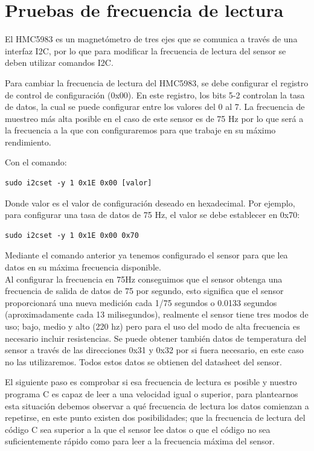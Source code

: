 \section{Pruebas de frecuencia de lectura}

El HMC5983 es un magnetómetro de tres ejes que se comunica a través de una interfaz I2C, por lo que para modificar la frecuencia de lectura del sensor se deben utilizar comandos I2C.

Para cambiar la frecuencia de lectura del HMC5983, se debe configurar el registro de control de configuración (0x00). En este registro, los bits 5-2 controlan la tasa de datos, la cual se puede configurar entre los valores del 0 al 7. La frecuencia de muestreo más alta posible en el caso de este sensor es de 75 Hz por lo que será a la frecuencia a la que con configuraremos para que trabaje en su máximo rendimiento.

Con el comando: 
\begin{lstlisting}[style=terminal]
sudo i2cset -y 1 0x1E 0x00 [valor] 
\end{lstlisting}

Donde valor es el valor de configuración deseado en hexadecimal. Por ejemplo, para configurar una tasa de datos de 75 Hz, el valor se debe establecer en 0x70:

\begin{lstlisting}[style=terminal]
sudo i2cset -y 1 0x1E 0x00 0x70  
\end{lstlisting}


Mediante el comando anterior ya tenemos configurado el sensor para que lea datos en su máxima frecuencia disponible.\\

Al configurar la frecuencia en 75Hz conseguimos que el sensor obtenga una frecuencia de salida de datos de 75 por segundo, esto significa que el sensor proporcionará una nueva medición cada 1/75 segundos o 0.0133 segundos (aproximadamente cada 13 milisegundos), realmente el sensor tiene tres modos de uso; bajo, medio y alto (220 hz) pero para el uso del modo de alta frecuencia es necesario incluir resistencias. Se puede obtener también datos de temperatura del sensor a través de las direcciones 0x31 y 0x32 por si fuera necesario, en este caso no las utilizaremos. Todos estos datos se obtienen del datasheet del sensor.

El siguiente paso es comprobar si esa frecuencia de lectura es posible y nuestro programa C es capaz de leer a una velocidad igual o superior, para plantearnos esta situación debemos observar a qué frecuencia de lectura los datos comienzan a repetirse, en este punto existen dos posibilidades; que la frecuencia de lectura del código C sea superior a la que el sensor lee datos o que el código no sea suficientemente rápido como para leer a la frecuencia máxima del sensor.

